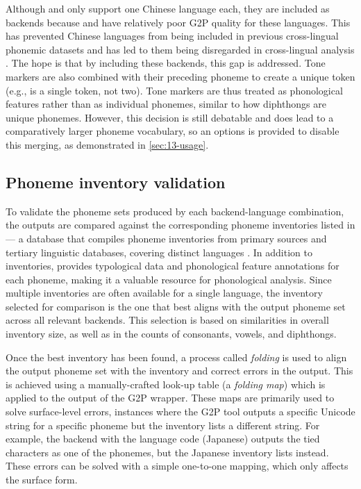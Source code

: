 Although \pinyin and \pingyam only support one Chinese language each, they are included as backends because \epitran and \phonemizer have relatively poor G2P quality for these languages. This has prevented Chinese languages from being included in previous cross-lingual phonemic datasets \citep{ahn-chodroff-2022-voxcommunis} and has led to them being disregarded in cross-lingual analysis \citep{pimentel2020phonotactic}. The hope is that by including these backends, this gap is addressed. Tone markers are also combined with their preceding phoneme to create a unique token (e.g.,  is a single token, not two). Tone markers are thus treated as phonological features rather than as individual phonemes, similar to how diphthongs are unique phonemes. However, this decision is still debatable and does lead to a comparatively larger phoneme vocabulary, so an options is provided to disable this merging, as demonstrated in \cref{sec:13-usage}. 

\subsection{Phoneme inventory validation}\label{sec:13-folding}

To validate the phoneme sets produced by each backend-language combination, the outputs are compared against the corresponding phoneme inventories listed in \phoible --- a database that compiles phoneme inventories from primary sources and tertiary linguistic databases, covering  distinct languages \citep{phoible}. In addition to inventories, \phoible provides typological data and phonological feature annotations for each phoneme, making it a valuable resource for phonological analysis. Since multiple inventories are often available for a single language, the inventory selected for comparison is the one that best aligns with the output phoneme set across all relevant backends. This selection is based on similarities in overall inventory size, as well as in the counts of consonants, vowels, and diphthongs.

Once the best inventory has been found, a process called \emph{folding} is used to align the output phoneme set with the inventory and correct errors in the output. This is achieved using a manually-crafted look-up table (a \emph{folding map}) which is applied to the output of the G2P wrapper. These maps are primarily used to solve surface-level errors, instances where the G2P tool outputs a specific Unicode string for a specific phoneme but the inventory lists a different string. For example, the \phonemizer backend with the  language code (Japanese) outputs the tied characters  as one of the phonemes, but the Japanese inventory lists  instead. These errors can be solved with a simple one-to-one mapping, which only affects the surface form.

